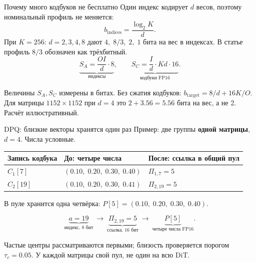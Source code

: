 \documentclass[aspectratio=169,10pt]{beamer}
\newcommand{\takeaway}[1]{\par\vspace{1.5mm}{\bfseries #1\par}}
\newcommand{\smalltext}[1]{{\fontsize{10}{12}\selectfont #1\par}}
\newenvironment{datatable}{\par\begingroup\fontsize{10}{12}\selectfont\setlength{\tabcolsep}{4pt}\renewcommand{\arraystretch}{1.25}}{\par\endgroup}
\begin{document}
\begin{frame}[t]{Почему много кодбуков не бесплатно}
  Один индекс кодирует $d$ весов, поэтому номинальный профиль не меняется:
  \[
    b_{\mathrm{indices}}=\frac{\log_2 K}{d}.
  \]
  При $K=256$: $d=2,3,4,8$ дают $4,\;8/3,\;2,\;1$ бита на вес в индексах.
  В статье профиль $8/3$ обозначен как трёхбитный.
  \[
    \underbrace{S_A=\frac{OI}{d}\cdot8}_{\text{индексы}},\qquad
    \underbrace{S_C=\frac{I}{d}\cdot Kd\cdot16}_{\text{кодбуки FP16}}.
  \]
  \smalltext{Величины $S_A,S_C$ измерены в битах. Без сжатия кодбуков:
  $b_{\mathrm{target}}=8/d+16K/O$. Для матрицы $1152\times1152$ при $d=4$
  это $2+3.56=5.56$ бита на вес, а не 2. Расчёт иллюстративный.}
  \takeaway{Плата за отдельные кодбуки становится существенной.\par
  Поэтому компрессия кодбуков является частью алгоритма.}
\end{frame}

\begin{frame}[t]{DPQ: близкие векторы хранятся один раз}
  Пример: две группы \textbf{одной матрицы}, $d=4$. Числа условные.
  \begin{datatable}
    \begin{tabular*}{\textwidth}{@{\extracolsep{\fill}}lll@{}}
      \toprule
      Запись кодбука & До: четыре числа & После: ссылка в общий пул \\
      \midrule
      $C_1[7]$ & $(0.10,\;0.20,\;0.30,\;0.40)$ & $\Pi_{1,7}=5$ \\
      $C_2[19]$ & $(0.10,\;0.20,\;0.30,\;0.41)$ & $\Pi_{2,19}=5$ \\
      \bottomrule
    \end{tabular*}
  \end{datatable}
  В пуле хранится одна четвёрка: $P[5]=(0.10,\;0.20,\;0.30,\;0.40)$.

  \[
    \underbrace{a=19}_{\text{индекс, 8 бит}}
    \ \longrightarrow\
    \underbrace{\Pi_{2,19}=5}_{\text{ссылка, 16 бит}}
    \ \longrightarrow\
    \underbrace{P[5]}_{\text{четыре числа FP16}}.
  \]
  \smalltext{Частые центры рассматриваются первыми; близость проверяется порогом
  $\tau_c=0.05$. У каждой матрицы свой пул, не один на всю DiT.}
  \takeaway{Экономия: значения не дублируются в кодбуках групп.\par
  Цена: таблица ссылок и ошибка от объединения близких центров.}
\end{frame}
\end{document}

